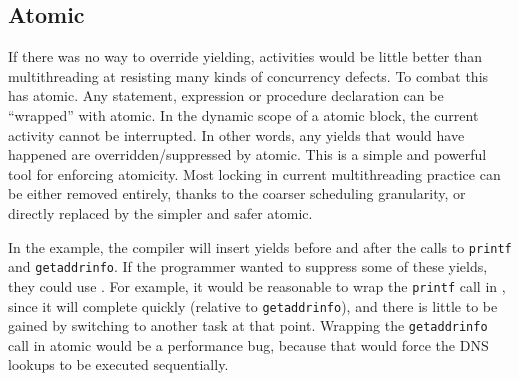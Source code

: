 \documentclass[a4paper,UKenglish,cleveref, autoref]{lipics-v2019}
\begin{document}







\subsection{Atomic}
\label{sec:atomic}

If there was no way to override yielding, activities would be little better than multithreading at resisting many kinds of concurrency defects.
To combat this \charcoal{} has atomic.
Any statement, expression or procedure declaration can be ``wrapped'' with atomic.
In the dynamic scope of a atomic block, the current activity cannot be interrupted.
In other words, any yields that would have happened are overridden/suppressed by atomic.
This is a simple and powerful tool for enforcing atomicity.
Most locking in current multithreading practice can be either removed entirely, thanks to the coarser scheduling granularity, or directly replaced by the simpler and safer atomic.

In the example, the compiler will insert yields before and after the calls to \texttt{printf} and \texttt{getaddrinfo}.
If the programmer wanted to suppress some of these yields, they could use \atomic{}.
For example, it would be reasonable to wrap the \texttt{printf} call in \atomic{}, since it will complete quickly (relative to \texttt{getaddrinfo}), and there is little to be gained by switching to another task at that point.
Wrapping the \texttt{getaddrinfo} call in atomic would be a performance bug, because that would force the DNS lookups to be executed sequentially.
\end{document}
